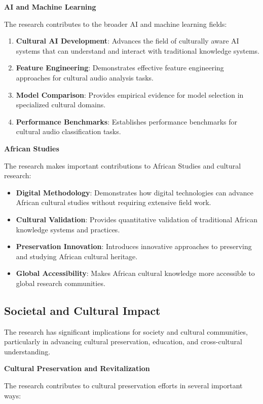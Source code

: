 \documentclass[12pt,a4paper]{article}
\begin{document}
\textbf{AI and Machine Learning}

The research contributes to the broader AI and machine learning fields:

\begin{enumerate}
\item \textbf{Cultural AI Development}: Advances the field of culturally aware AI systems that can understand and interact with traditional knowledge systems.
\item \textbf{Feature Engineering}: Demonstrates effective feature engineering approaches for cultural audio analysis tasks.
\item \textbf{Model Comparison}: Provides empirical evidence for model selection in specialized cultural domains.
\item \textbf{Performance Benchmarks}: Establishes performance benchmarks for cultural audio classification tasks.
\end{enumerate}

\textbf{African Studies}

The research makes important contributions to African Studies and cultural research:

\begin{itemize}
\item \textbf{Digital Methodology}: Demonstrates how digital technologies can advance African cultural studies without requiring extensive field work.
\item \textbf{Cultural Validation}: Provides quantitative validation of traditional African knowledge systems and practices.
\item \textbf{Preservation Innovation}: Introduces innovative approaches to preserving and studying African cultural heritage.
\item \textbf{Global Accessibility}: Makes African cultural knowledge more accessible to global research communities.
\end{itemize}

\subsection{Societal and Cultural Impact}

The research has significant implications for society and cultural communities, particularly in advancing cultural preservation, education, and cross-cultural understanding.

\textbf{Cultural Preservation and Revitalization}

The research contributes to cultural preservation efforts in several important ways:
\end{document}
